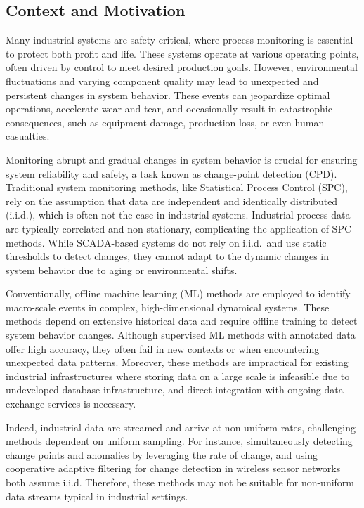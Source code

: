 \subsection{Context and Motivation}
Many industrial systems are safety-critical, where process monitoring is essential to protect both profit and life. These systems operate at various operating points, often driven by control to meet desired production goals. However, environmental fluctuations and varying component quality may lead to unexpected and persistent changes in system behavior. These events can jeopardize optimal operations, accelerate wear and tear, and occasionally result in catastrophic consequences, such as equipment damage, production loss, or even human casualties.

Monitoring abrupt and gradual changes in system behavior is crucial for ensuring system reliability and safety, a task known as change-point detection (CPD). Traditional system monitoring methods, like Statistical Process Control (SPC), rely on the assumption that data are independent and identically distributed (i.i.d.), which is often not the case in industrial systems. Industrial process data are typically correlated and non-stationary, complicating the application of SPC methods. While SCADA-based systems do not rely on i.i.d.\ and use static thresholds to detect changes, they cannot adapt to the dynamic changes in system behavior due to aging or environmental shifts.

Conventionally, offline machine learning (ML) methods are employed to identify macro-scale events in complex, high-dimensional dynamical systems. These methods depend on extensive historical data and require offline training to detect system behavior changes. Although supervised ML methods with annotated data offer high accuracy, they often fail in new contexts or when encountering unexpected data patterns. Moreover, these methods are impractical for existing industrial infrastructures where storing data on a large scale is infeasible due to undeveloped database infrastructure, and direct integration with ongoing data exchange services is necessary.

Indeed, industrial data are streamed and arrive at non-uniform rates, challenging methods dependent on uniform sampling. For instance, \citet{Liu2023} simultaneously detecting change points and anomalies by leveraging the rate of change, and \citet{Fathy2019} using cooperative adaptive filtering for change detection in wireless sensor networks both assume i.i.d. Therefore, these methods may not be suitable for non-uniform data streams typical in industrial settings.

